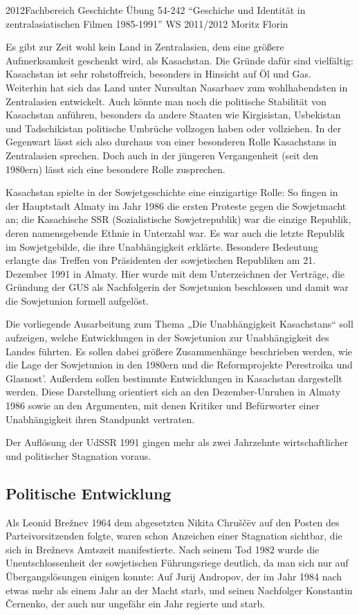 \documentclass{../../sem_paper}
\begin{document}
{2012}{Fachbereich Geschichte}
{Übung 54-242 "`Geschiche und Identität in zentralasiatischen Filmen 1985-1991"'}
{WS 2011/2012}
{Moritz Florin}

\tocpaper


Es gibt zur Zeit wohl kein Land in Zentralasien, dem eine größere Aufmerksamkeit
geschenkt wird, als Kasachstan. Die Gründe dafür sind vielfältig: Kasachstan ist sehr
rohstoffreich, besonders in Hinsicht auf Öl und Gas. Weiterhin hat sich das Land unter
Nursultan Nasarbaev zum wohlhabendsten in Zentralasien entwickelt. Auch könnte
man noch die politische Stabilität von Kasachstan anführen, besonders da andere
Staaten wie Kirgisistan, Usbekistan und Tadschikistan politische Umbrüche vollzogen
haben oder vollziehen. In der Gegenwart lässt sich also durchaus von einer besonderen
Rolle Kasachstans in Zentralasien sprechen. Doch auch in der jüngeren Vergangenheit
(seit den 1980ern) lässt sich eine besondere Rolle zusprechen.

Kasachstan spielte in der Sowjetgeschichte eine einzigartige Rolle: So
fingen in der Hauptstadt Almaty im Jahr 1986 die ersten Proteste gegen die
Sowjetmacht an; die Kasachische SSR (Sozialistische Sowjetrepublik) war die einzige
Republik, deren namensgebende Ethnie in Unterzahl war. Es war auch die letzte
Republik im Sowjetgebilde, die ihre Unabhängigkeit erklärte. Besondere Bedeutung
erlangte das Treffen von Präsidenten der sowjetischen Republiken am 21. Dezember
1991 in Almaty. Hier wurde mit dem Unterzeichnen der Verträge, die Gründung der
GUS als Nachfolgerin der Sowjetunion beschlossen und damit war die Sowjetunion
formell aufgelöst.

Die vorliegende Ausarbeitung zum Thema „Die Unabhängigkeit Kasachstans“ soll
aufzeigen, welche Entwicklungen in der Sowjetunion zur Unabhängigkeit des Landes
führten. Es sollen dabei größere Zusammenhänge beschrieben werden, wie die Lage der
Sowjetunion in den 1980ern und die Reformprojekte Perestroika und Glasnost'.
Außerdem sollen bestimmte Entwicklungen in Kasachstan dargestellt werden. Diese
Darstellung orientiert sich an den Dezember-Unruhen in Almaty 1986 sowie an den
Argumenten, mit denen Kritiker und Befürworter einer Unabhängigkeit ihren
Standpunkt vertraten.

Der Auflösung der UdSSR 1991 gingen mehr als zwei Jahrzehnte wirtschaftlicher
und politischer Stagnation voraus.
\subsection{Politische Entwicklung}
Als Leonid Brežnev 1964 dem abgesetzten Nikita Chruščëv auf den Posten des
Parteivorsitzenden folgte, waren schon Anzeichen einer Stagnation sichtbar, die sich in
Brežnevs Amtszeit manifestierte. Nach seinem Tod 1982 wurde die Unentschlossenheit
der sowjetischen Führungsriege deutlich, da man sich nur auf Übergangslösungen
einigen konnte: Auf Jurij Andropov, der im Jahr 1984 nach etwas mehr als einem Jahr an der
Macht starb, und seinen Nachfolger Konstantin Černenko, der auch nur ungefähr ein
Jahr regierte und starb.
\end{document}
